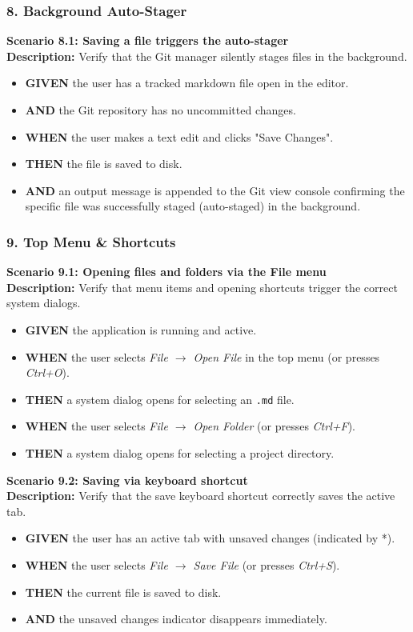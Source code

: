 \documentclass[12pt, a4paper]{article}
\begin{document}
\subsubsection*{8. Background Auto-Stager}

\textbf{Scenario 8.1: Saving a file triggers the auto-stager} \\
\textbf{Description:} Verify that the Git manager silently stages files in the background.
\begin{itemize}
    \item \textbf{GIVEN} the user has a tracked markdown file open in the editor.
    \item \textbf{AND} the Git repository has no uncommitted changes.
    \item \textbf{WHEN} the user makes a text edit and clicks "Save Changes".
    \item \textbf{THEN} the file is saved to disk.
    \item \textbf{AND} an output message is appended to the Git view console confirming the specific file was successfully staged (auto-staged) in the background.
\end{itemize}

\subsubsection*{9. Top Menu \& Shortcuts}

\textbf{Scenario 9.1: Opening files and folders via the File menu} \\
\textbf{Description:} Verify that menu items and opening shortcuts trigger the correct system dialogs.
\begin{itemize}
    \item \textbf{GIVEN} the application is running and active.
    \item \textbf{WHEN} the user selects \textit{File $\rightarrow$ Open File} in the top menu (or presses \textit{Ctrl+O}).
    \item \textbf{THEN} a system dialog opens for selecting an \texttt{.md} file.
    \item \textbf{WHEN} the user selects \textit{File $\rightarrow$ Open Folder} (or presses \textit{Ctrl+F}).
    \item \textbf{THEN} a system dialog opens for selecting a project directory.
\end{itemize}

\textbf{Scenario 9.2: Saving via keyboard shortcut} \\
\textbf{Description:} Verify that the save keyboard shortcut correctly saves the active tab.
\begin{itemize}
    \item \textbf{GIVEN} the user has an active tab with unsaved changes (indicated by *).
    \item \textbf{WHEN} the user selects \textit{File $\rightarrow$ Save File} (or presses \textit{Ctrl+S}).
    \item \textbf{THEN} the current file is saved to disk.
    \item \textbf{AND} the unsaved changes indicator disappears immediately.
\end{itemize}
\end{document}
